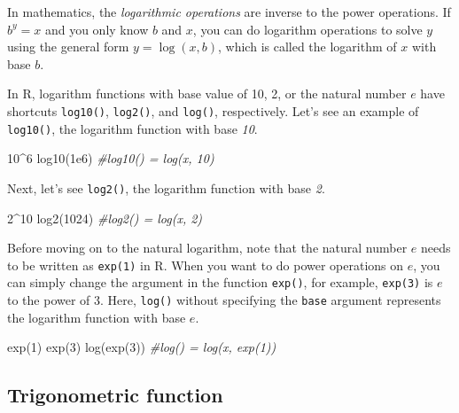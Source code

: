 \documentclass[
]{book}
\newenvironment{Shaded}{\begin{snugshade}}{\end{snugshade}}
\newcommand{\CommentTok}[1]{\textcolor[rgb]{0.56,0.35,0.01}{\textit{#1}}}
\newcommand{\DecValTok}[1]{\textcolor[rgb]{0.00,0.00,0.81}{#1}}
\newcommand{\FloatTok}[1]{\textcolor[rgb]{0.00,0.00,0.81}{#1}}
\newcommand{\FunctionTok}[1]{\textcolor[rgb]{0.00,0.00,0.00}{#1}}
\newcommand{\NormalTok}[1]{#1}
\newcommand{\SpecialCharTok}[1]{\textcolor[rgb]{0.00,0.00,0.00}{#1}}
\begin{document}
In mathematics, the \emph{logarithmic operations} are inverse to the power operations. If \textbf{\(b^y = x\)} and you only know \emph{\(b\)} and \emph{\(x\)}, you can do logarithm operations to solve \emph{\(y\)} using the general form \textbf{\(y = \log(x, b)\)}, which is called the logarithm of \(x\) with base \(b\).

In R, logarithm functions with base value of 10, 2, or the natural number \(e\) have shortcuts \texttt{log10()}, \texttt{log2()}, and \texttt{log()}, respectively. Let's see an example of \texttt{log10()}, the logarithm function with base \emph{10}.

\begin{Shaded}
\begin{Highlighting}[]
\DecValTok{10}\SpecialCharTok{\^{}}\DecValTok{6} 
\FunctionTok{log10}\NormalTok{(}\FloatTok{1e6}\NormalTok{) }\CommentTok{\#log10() = log(x, 10)}
\end{Highlighting}
\end{Shaded}

Next, let's see \texttt{log2()}, the logarithm function with base \emph{2}.

\begin{Shaded}
\begin{Highlighting}[]
\DecValTok{2}\SpecialCharTok{\^{}}\DecValTok{10}
\FunctionTok{log2}\NormalTok{(}\DecValTok{1024}\NormalTok{)  }\CommentTok{\#log2() = log(x, 2)}
\end{Highlighting}
\end{Shaded}

Before moving on to the natural logarithm, note that the natural number \(e\) needs to be written as \texttt{exp(1)} in R. When you want to do power operations on \(e\), you can simply change the argument in the function \texttt{exp()}, for example, \texttt{exp(3)} is \(e\) to the power of 3. Here, \texttt{log()} without specifying the \texttt{base} argument represents the logarithm function with base \(e\).

\begin{Shaded}
\begin{Highlighting}[]
\FunctionTok{exp}\NormalTok{(}\DecValTok{1}\NormalTok{)      }
\FunctionTok{exp}\NormalTok{(}\DecValTok{3}\NormalTok{)}
\FunctionTok{log}\NormalTok{(}\FunctionTok{exp}\NormalTok{(}\DecValTok{3}\NormalTok{))  }\CommentTok{\#log() = log(x, exp(1))}
\end{Highlighting}
\end{Shaded}

\hypertarget{trigonometric-function}{%
\subsection{Trigonometric function}\label{trigonometric-function}}
\end{document}
